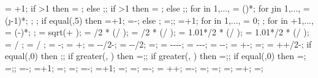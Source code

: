 {{\levelnumber = \storynumber+1; %
if \storynumber>1 then {\nlevmo = ;} else {;};
if \baynumber>1 then {\ncolmo = ;} else {;};
for \iii in {1,...,{\levelnumber}}{
\y{\iii} = ()*\storyheight;
for \j in {1,...,{\columnnumber}}{
\x{\j} = (\j-1)*\baywidth;
};
};
if equal(\showsupports,5) then
{=\subfloors+1;
\superstorynumber=\storynumber-\subfloors;}
else
{;
\superstorynumber=\storynumber;};
=+1;
for \idefl in {1,...,{}}{
	 = 0;
};
for \idefl in {+1,...,{\levelnumber}}{
	 = (\idefl-)*\drift;
};
\tempdim = sqrt( + );
\fixbeamx = \collinet/2 * ( / \tempdim);
\fixbeamy = \collinet/2 * ( / \tempdim);
\fixcoly = 1.01*\beamlinet/2 * ( / \tempdim);
\fixcolx = 1.01*\beamlinet/2 * ( / \tempdim);
 =  / \storyheight * \baywidth;
 =  / \storyheight * \baywidth;
\rigbasestartx = -\supportwidth;
\rigbaseendx = \x{\columnnumber}+\supportwidth;
\isoboty = -\supportheight-\baselinet/2-\isolationdepth;
\isotopy = -\supportheight-\baselinet/2;
\isodeflx=\isodeflratio*\isolationdepth*\showdefl;
\foundboty = -\supportheight-\baselinet-\isolationdepth-\foundationdepth;
\foundtopy = -\supportheight-\baselinet-\isolationdepth;
\foundstartx = -\foundsidew-\isodeflx;
\foundendx = \x{\columnnumber}+\foundsidew-\isodeflx;
\structheight=\storynumber*\storyheight;
\isomidy = \supportheight+\isolinet+\isolationdepth/2-\baselinet;
if equal(\subfloors,0) then {;};
if greater(\leftstory, \subfloors) then {\leftstory=\subfloors;};
if greater(\rightstory, \subfloors) then {\rightstory=\subfloors;};
if equal(\showopenstory,0) then
{\leftstory=\subfloors;
\rightstory=\subfloors;};
\leftopenstory=\subfloors-\leftstory;
\leftlevel=\leftstory+1;
\leftwallh=\leftstory*\storyheight;
\leftopenh=\leftopenstory*\storyheight;
\rightopenstory=\subfloors-\rightstory;
\rightlevel=\rightstory+1;
\rightwallh=\rightstory*\storyheight;
\rightopenh=\rightopenstory*\storyheight;
\diffwallh=\leftwallh-\rightwallh;
\soilbelowfoundtof = \soilbelowfound+\supportheight+\hsdistbottom;
\basewallstartx=-\supportwidth;
\buildingwidth=\baynumber*\baywidth;
\basewalldepth=\subfloors*\storyheight;
\basewallstarty=\basewalldepth;
\basewallendx=\buildingwidth+\supportwidth;
\basewallendy=\basewallstarty;
}}
